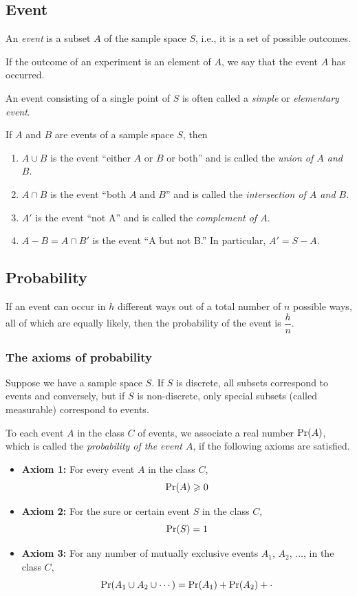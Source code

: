 	\subsection{Event}
		An \emph{event} is a subset $A$ of the sample space $S$, i.e., it is a set of possible outcomes.
		
		If the outcome of an experiment is an element of $A$, we say that the event $A$ has occurred.
		
		An event consisting of a single point of $S$ is often called a \emph{simple} or \emph{elementary event}.
		
		If $A$ and $B$ are events of a sample space $S$, then
		\begin{enumerate}
			\item $A\cup B$ is the event ``either $A$ or $B$ or both'' and is called the \emph{union of $A$ and $B$}.
			
			\item $A\cap B$ is the event ``both $A$ and $B$'' and is called the \emph{intersection of $A$ and $B$}.
			
			\item $A'$ is the event ``not A'' and is called the \emph{complement of $A$}.
			
			\item $A-B=A\cap B'$ is the event ``A but not B.'' In particular, $A'=S-A$.
		\end{enumerate}
		
	\subsection{Probability}
		If an event can occur in $h$ different ways out of a total number of $n$ possible ways, all of which are equally likely, then the probability of the event is $\dfrac{h}{n}$.
		
		\subsubsection{The axioms of probability}
			Suppose we have a sample space $S$. If $S$ is discrete, all subsets correspond to events and conversely, but if $S$ is non-discrete, only special subsets (called measurable) correspond to events.
			
			To each event $A$ in the class $C$ of events, we associate a real number $\mathrm{Pr}\qty(A)$, which is called the \emph{probability of the event $A$}, if the following axioms are satisfied.
			\begin{itemize}
				\item \textbf{Axiom 1:} For every event $A$ in the class $C$,
				$$\mathrm{Pr}\qty(A)\geqslant 0$$
				
				\item \textbf{Axiom 2:} For the sure or certain event $S$ in the class $C$,
				$$\mathrm{Pr}\qty(S)=1$$
				
				\item \textbf{Axiom 3:} For any number of mutually exclusive events $A_1$, $A_2$, $\dots$, in the class $C$,
				$$\mathrm{Pr}\qty(A_1\cup A_2\cup\cdots)=\mathrm{Pr}\qty(A_1)+\mathrm{Pr}\qty(A_2)+\cdot$$
			\end{itemize}